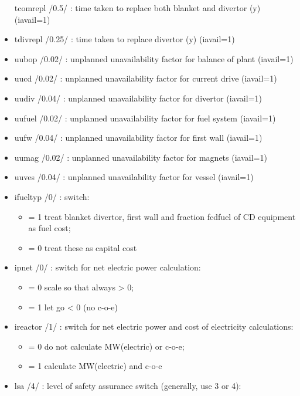 \documentclass[]{article}
\providecommand{\tightlist}{%
  \setlength{\itemsep}{0pt}\setlength{\parskip}{0pt}}
\begin{document}
\begin{itemize}
  tcomrepl /0.5/ : time taken to replace both blanket and divertor (y)
  (iavail=1)
\item
  tdivrepl /0.25/ : time taken to replace divertor (y) (iavail=1)
\item
  uubop /0.02/ : unplanned unavailability factor for balance of plant
  (iavail=1)
\item
  uucd /0.02/ : unplanned unavailability factor for current drive
  (iavail=1)
\item
  uudiv /0.04/ : unplanned unavailability factor for divertor (iavail=1)
\item
  uufuel /0.02/ : unplanned unavailability factor for fuel system
  (iavail=1)
\item
  uufw /0.04/ : unplanned unavailability factor for first wall
  (iavail=1)
\item
  uumag /0.02/ : unplanned unavailability factor for magnets (iavail=1)
\item
  uuves /0.04/ : unplanned unavailability factor for vessel (iavail=1)
\item
  ifueltyp /0/ : switch:

  \begin{itemize}
  \tightlist
  \item
    = 1 treat blanket divertor, first wall and fraction fcdfuel of CD
    equipment as fuel cost;
  \item
    = 0 treat these as capital cost
  \end{itemize}
\item
  ipnet /0/ : switch for net electric power calculation:

  \begin{itemize}
  \tightlist
  \item
    = 0 scale so that always \textgreater{} 0;
  \item
    = 1 let go \textless{} 0 (no c-o-e)
  \end{itemize}
\item
  ireactor /1/ : switch for net electric power and cost of electricity
  calculations:

  \begin{itemize}
  \tightlist
  \item
    = 0 do not calculate MW(electric) or c-o-e;
  \item
    = 1 calculate MW(electric) and c-o-e
  \end{itemize}
\item
  lsa /4/ : level of safety assurance switch (generally, use 3 or 4):


\end{itemize}
\end{document}
